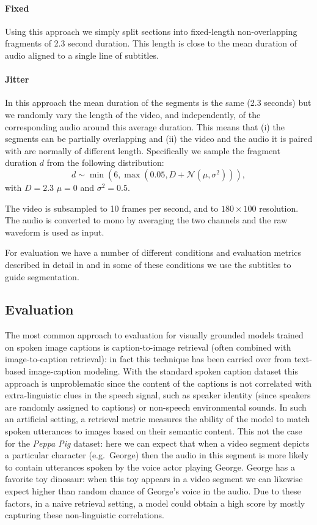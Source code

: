\paragraph{Fixed} Using this approach we simply split sections into
fixed-length non-overlapping fragments of 2.3 second duration. This
length is close to the mean duration of audio aligned to a single line
of subtitles.

\paragraph{Jitter} In this approach the mean duration of the segments
is the same (2.3 seconds) but we randomly vary the length of the
video, and independently, of the corresponding audio around this
average duration. This means that (i) the segments can be partially
overlapping and (ii) the video and the audio it is paired with are
normally of different length. Specifically we sample the fragment duration $d$
from the following distribution:
\begin{dmath}
  d \sim \min(6, \max(0.05, D + \mathcal{N}(\mu, \sigma^2))),
\end{dmath}
with $D=2.3$ $\mu=0$ and $\sigma^2=0.5$.
\vskip 0.5cm

The video is subsampled to 10 frames per second, and to
$180\times 100$ resolution. The audio is converted to mono by
averaging the two channels and the raw waveform is used as input.

For evaluation we have a number of different conditions and evaluation
metrics described in detail in  and in some of these
conditions we use the subtitles to guide
segmentation. 

\subsection{Evaluation}
\label{sec:eval}
The most common approach to evaluation for visually grounded models
trained on spoken image captions is caption-to-image retrieval (often
combined with image-to-caption retrieval): in fact this technique
has been carried over from text-based image-caption modeling.
 With the standard spoken caption dataset this approach is unproblematic since
the content of the captions is not correlated with extra-linguistic
clues in the speech signal, such as speaker identity (since speakers
are randomly assigned to captions) or non-speech environmental
sounds. In such an artificial setting, a retrieval metric measures the ability of the
model to match spoken utterances to images based on their semantic
content. This not the case for the {\it Peppa Pig} dataset: here we
can expect that when a video segment depicts a particular character
(e.g.\ George) then the audio in this segment is more likely to contain
utterances spoken by the voice actor playing George. George has a
favorite toy dinosaur: when this toy appears in a video segment we can
likewise expect higher than random chance of George's voice in the
audio. Due to these factors, in a naive retrieval setting, a model
could obtain a high score by mostly capturing these non-linguistic
correlations.

